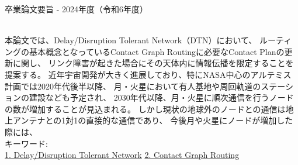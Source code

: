 卒業論文要旨 - 2024年度（令和6年度）
\begin{center}
\begin{large}
\end{large}
\end{center}

~ \\
本論文では、Delay/Disruption Tolerant Network（DTN）において、
ルーティングの基本概念となっているContact Graph Routingに必要なContact Planの更新に関し、
リンク障害が起きた場合にその天体内に情報伝播を限定することを提案する。
近年宇宙開発が大きく進展しており、特にNASA中心のアルテミス計画では2020年代後半以降、
月・火星において有人基地や周回軌道のステーションの建設なども予定され、
2030年代以降、月・火星に順次通信を行うノードの数が増加することが見込まれる。
しかし現状の地球外のノードとの通信は地上アンテナとの1対1の直接的な通信であり、
今後月や火星にノードが増加した際には、
~ \\


キーワード:\\
\underline{1. Delay/Disruption Tolerant Network} 
\underline{2. Contact Graph Routing} 
\begin{flushright}
\dept \\
\author
\end{flushright}

